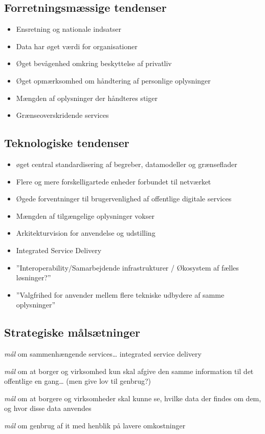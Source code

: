 \subsection{Forretningsmæssige
tendenser}\label{forretningsmuxe6ssige-tendenser}

\begin{itemize}
\tightlist
\item
  Ensretning og nationale indsatser
\item
  Data har øget værdi for organisationer
\item
  Øget bevågenhed omkring beskyttelse af privatliv
\item
  Øget opmærksomhed om håndtering af personlige oplysninger
\item
  Mængden af oplysninger der håndteres stiger
\item
  Grænseoverskridende services
\end{itemize}

\subsection{Teknologiske tendenser}\label{teknologiske-tendenser}

\begin{itemize}
\tightlist
\item
  øget central standardisering af begreber, datamodeller og grænseflader
\item
  Flere og mere forskelligartede enheder forbundet til netværket
\item
  Øgede forventninger til brugervenlighed af offentlige digitale
  services
\item
  Mængden af tilgængelige oplysninger vokser
\item
  Arkitekturvision for anvendelse og udstilling
\item
  Integrated Service Delivery
\item
  ''Interoperability/Samarbejdende infrastrukturer / Økosystem af fælles
  løsninger?''
\item
  ''Valgfrihed for anvender mellem flere tekniske udbydere af samme
  oplysninger''
\end{itemize}

\subsection{Strategiske
målsætninger}\label{strategiske-muxe5lsuxe6tninger}

\begin{description}
\tightlist
\item[Interoperability]
\emph{mål} om sammenhængende services\ldots{} integrated service
delivery
\item[Once-only]
\emph{mål} om at borger og virksomhed kun skal afgive den samme
information til det offentlige en gang\ldots{} (men give lov til
genbrug?)
\item[Transperancy]
\emph{mål} om at borgere og virksomheder skal kunne se, hvilke data der
findes om dem, og hvor disse data anvendes
\item[Re-use]
\emph{mål} om genbrug af it med henblik på lavere omkostninger
\end{description}

